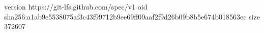 version https://git-lfs.github.com/spec/v1
oid sha256:a1ab9e5538075af3c43f99712b9ee69ff09aaf2f9d26b09b8b5e674b018563ec
size 372607

